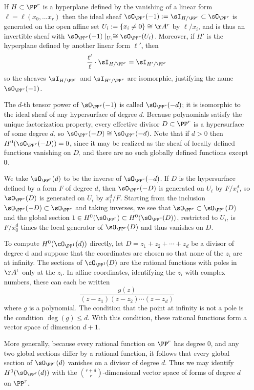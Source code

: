 \begin{example} \label{linear series on Pr} If $H\subset \PP^{r}$ is a hyperplane defined by the vanishing of a linear form $\ell = \ell(x_{0}, \dots x_{r})$ then the ideal sheaf $\sO_{\PP^{r}}(-1) := \sI_{H/\PP^{r}}\subset \sO_{\PP^{r}}$ is generated on the open affine set 
$U_{i}:= \{x_{i}\neq 0\} \cong \AA^{r}$
by $\ell/x_{i}$, and is thus an invertible sheaf with $\sO_{\PP^{r}}(-1)\mid_{U_i} \cong \sO_{\PP^{r}}(U_i)$.
Moreover, if $H'$ is the hyperplane defined by another linear form $\ell'$, then 
$$
\frac{\ell'}{\ell}\cdot\sI_{H/\PP^{r}} = \sI_{H'/\PP^{r}} 
$$
so the sheaves $\sI_{H/\PP^{r}}$ and $\sI_{H'/\PP^{r}} $ are isomorphic, justifying the name $\sO_{\PP^{r}}(-1)$.

The $d$-th tensor power of $\sO_{\PP^{r}}(-1)$ is called $\sO_{\PP^{r}}(-d)$; it is isomorphic to the
ideal sheaf of any hypersurface of degree $d$. Because polynomials satisfy the unique factorization property,
every effective divisor $D\subset \PP^{r}$ is a hypersurface of some degree $d$, so
$\sO_{\PP^{r}}(-D) \cong \sO_{\PP^{r}}(-d)$. Note that if $d>0$ then $H^{0}(\sO_{\PP^{r}}(-D)) = 0$, since it may be realized
as the sheaf of locally defined functions vanishing on $D$, and there are no such
globally defined functions except 0.

We take $\sO_{\PP^{r}}(d)$ to be the inverse of $\sO_{\PP^{r}}(-d)$. If $D$ is the hypersurface defined by 
a form $F$ of degree $d$, then $\sO_{\PP^{r}}(-D)$ is generated on $U_{i}$ by $F/x_{i}^{d}$, so
$\sO_{\PP^{r}}(D)$ is generated on $U_{i}$ by $x_{i}^{d}/F$.
Starting from the inclusion 
$
\sO_{\PP^{r}}(-D) \subset \sO_{\PP^{r}}
$
and taking inverses, we see that 
$
\sO_{\PP^{r}} \subset \sO_{\PP^{r}}(D)
$
and the global section $1\in H^0(\sO_{\PP^{r}})\subset H^0(\sO_{\PP^{r}}(D))$, restricted to
$U_{i}$, is $F/x_{0}^{d}$ times the local generator of $\sO_{\PP^{r}}(D)$ and thus vanishes on $D$.
 
To compute $H^0(\cO_{\PP^1} (d))$ directly, let $D = z_1 +z_2 +\cdots+z_d$ be a divisor of degree d and suppose that the coordinates are chosen so that none of the $z_i$ are at infinity. The sections of $\cO_{\PP^1} (D)$ are the rational functions with poles in $\AA^1$ only at 
the $z_i$. In affine coordinates, identifying the $z_i$ with complex numbers, these can each be written
$$
\frac{g(z)}{(z-z_1)(z-z_2)\cdots(z-z_d)}
$$
where $g$ is a polynomial. The condition that the point at infinity is not a pole is the condition $\deg(g) \leq d$. With this condition, these rational functions form a vector space of dimension $d+1$.

More generally, because every
rational function on $\PP^{r}$ has degree 0, and any two global sections differ by a rational
function, it follows that every global section of $\sO_{\PP^{r}}(d)$ vanishes on a divisor of degree $d$. Thus
we may identify $H^{0}(\sO_{\PP^{r}}(d))$ with the ${r+d\choose r}$-dimensional vector space of forms of degree $d$ on $\PP^{r}$.
\end{example}


